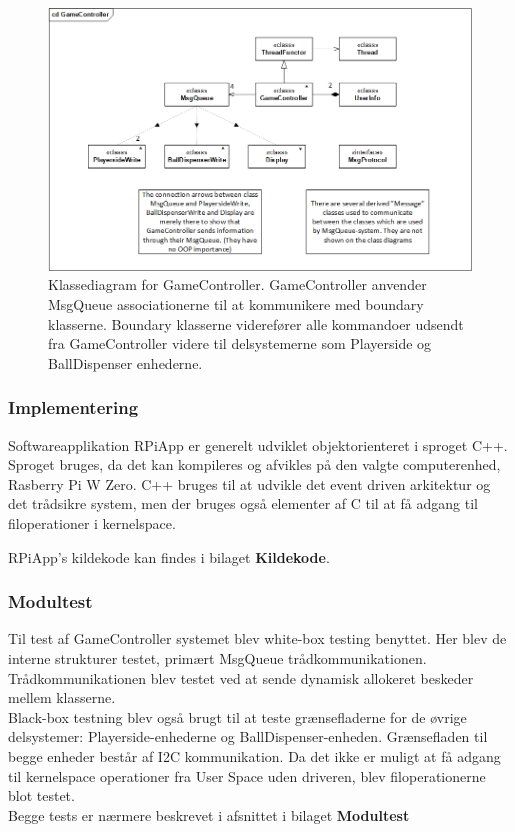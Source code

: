 \documentclass[Rapport/Rapport_main.tex]{subfiles}
\begin{document}
\begin{figure}[H]
    \centering
    \includegraphics[width=1\textwidth]{Rapport/RPi/graphics/GameController.png}
    \caption{Klassediagram for GameController. GameController anvender MsgQueue associationerne til at kommunikere med boundary klasserne. Boundary klasserne viderefører alle kommandoer udsendt fra GameController videre til delsystemerne som Playerside og BallDispenser enhederne.}
   \label{fig:cd_GameController}
\end{figure}

\subsubsection{Implementering}
Softwareapplikation RPiApp er generelt udviklet objektorienteret i sproget C++. Sproget bruges, da det kan kompileres og afvikles på den valgte computerenhed, Rasberry Pi W Zero. C++ bruges til at udvikle det event driven arkitektur og det trådsikre system, men der bruges også elementer af C til at få adgang til filoperationer i kernelspace.

RPiApp's kildekode kan findes i bilaget \textbf{Kildekode}.

\subsubsection{Modultest}
Til test af GameController systemet blev white-box testing benyttet. Her blev de interne strukturer testet, primært MsgQueue trådkommunikationen. Trådkommunikationen blev testet ved at sende dynamisk allokeret beskeder mellem klasserne. \\
Black-box testning blev også brugt til at teste grænsefladerne for de øvrige delsystemer: Playerside-enhederne og BallDispenser-enheden. Grænsefladen til begge enheder består af I2C kommunikation. Da det ikke er muligt at få adgang til kernelspace operationer fra User Space uden driveren, blev filoperationerne blot testet. \\
Begge tests er nærmere beskrevet i afsnittet  i bilaget \textbf{Modultest}
\newpage
\end{document}
